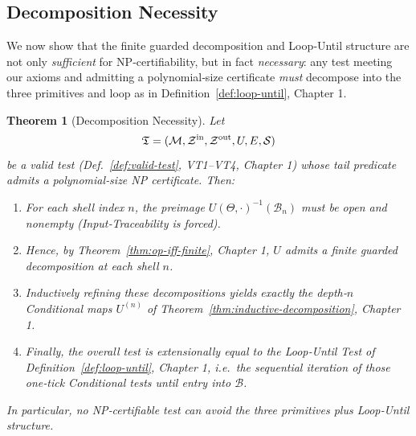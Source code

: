 \documentclass[12pt]{article}
\theoremstyle{definition}
\theoremstyle{plain}
\newtheorem{theorem}{Theorem}[section]
\begin{document}
\subsection{Decomposition Necessity}
\label{sec:decomp-necessity}

We now show that the finite guarded decomposition and Loop‑Until structure are not only \emph{sufficient} for NP‑certifiability, but in fact \emph{necessary}: any test meeting our axioms and admitting a polynomial‑size certificate \emph{must} decompose into the three primitives and loop as in Definition~\ref{def:loop-until}, Chapter 1.

\begin{theorem}[Decomposition Necessity]
\label{thm:decomp-necessity}
Let 
\[
  \mathfrak T=(\mathcal M,\mathcal Z^{\rm in},\mathcal Z^{\rm out},U,E,\mathcal S)
\]
be a valid test (Def.~\ref{def:valid-test}, VT1–VT4, Chapter 1) whose tail predicate admits a polynomial‑size NP certificate.  Then:
\begin{enumerate}[label=(\alph*)]
  \item For each shell index \(n\), the preimage 
    \(U(\Theta,\cdot)^{-1}(\mathcal B_n)\) must be open and nonempty (Input‑Traceability is forced).
  \item Hence, by Theorem~\ref{thm:op-iff-finite}, Chapter 1, \(U\) admits a finite guarded decomposition at each shell \(n\).
  \item Inductively refining these decompositions yields exactly the depth‑\(n\) Conditional maps \(U^{(n)}\) of Theorem~\ref{thm:inductive-decomposition}, Chapter 1.
  \item Finally, the overall test is extensionally equal to the Loop‑Until Test of Definition~\ref{def:loop-until}, Chapter 1, i.e.\ the sequential iteration of those one‑tick Conditional tests until entry into \(\mathcal B\).
\end{enumerate}
In particular, no NP‑certifiable test can avoid the three primitives plus Loop‑Until structure.
\end{theorem}
\end{document}
